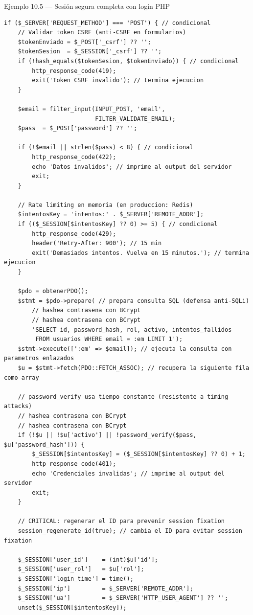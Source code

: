 \begin{cajaejemplo}{Ejemplo 10.5 --- Sesión segura completa con login PHP}
\begin{lstlisting}[style=php,caption={login.php con todas las prácticas},label=lst:10.12]
if ($_SERVER['REQUEST_METHOD'] === 'POST') { // condicional
    // Validar token CSRF (anti-CSRF en formularios)
    $tokenEnviado = $_POST['_csrf'] ?? '';
    $tokenSesion  = $_SESSION['_csrf'] ?? '';
    if (!hash_equals($tokenSesion, $tokenEnviado)) { // condicional
        http_response_code(419);
        exit('Token CSRF invalido'); // termina ejecucion
    }

    $email = filter_input(INPUT_POST, 'email',
                          FILTER_VALIDATE_EMAIL);
    $pass  = $_POST['password'] ?? '';

    if (!$email || strlen($pass) < 8) { // condicional
        http_response_code(422);
        echo 'Datos invalidos'; // imprime al output del servidor
        exit;
    }

    // Rate limiting en memoria (en produccion: Redis)
    $intentosKey = 'intentos:' . $_SERVER['REMOTE_ADDR'];
    if (($_SESSION[$intentosKey] ?? 0) >= 5) { // condicional
        http_response_code(429);
        header('Retry-After: 900'); // 15 min
        exit('Demasiados intentos. Vuelva en 15 minutos.'); // termina ejecucion
    }

    $pdo = obtenerPDO();
    $stmt = $pdo->prepare( // prepara consulta SQL (defensa anti-SQLi)
        // hashea contrasena con BCrypt
        // hashea contrasena con BCrypt
        'SELECT id, password_hash, rol, activo, intentos_fallidos
         FROM usuarios WHERE email = :em LIMIT 1');
    $stmt->execute([':em' => $email]); // ejecuta la consulta con parametros enlazados
    $u = $stmt->fetch(PDO::FETCH_ASSOC); // recupera la siguiente fila como array

    // password_verify usa tiempo constante (resistente a timing attacks)
    // hashea contrasena con BCrypt
    // hashea contrasena con BCrypt
    if (!$u || !$u['activo'] || !password_verify($pass, $u['password_hash'])) {
        $_SESSION[$intentosKey] = ($_SESSION[$intentosKey] ?? 0) + 1;
        http_response_code(401);
        echo 'Credenciales invalidas'; // imprime al output del servidor
        exit;
    }

    // CRITICAL: regenerar el ID para prevenir session fixation
    session_regenerate_id(true); // cambia el ID para evitar session fixation

    $_SESSION['user_id']    = (int)$u['id'];
    $_SESSION['user_rol']   = $u['rol'];
    $_SESSION['login_time'] = time();
    $_SESSION['ip']         = $_SERVER['REMOTE_ADDR'];
    $_SESSION['ua']         = $_SERVER['HTTP_USER_AGENT'] ?? '';
    unset($_SESSION[$intentosKey]);


\end{lstlisting}
\end{cajaejemplo}
